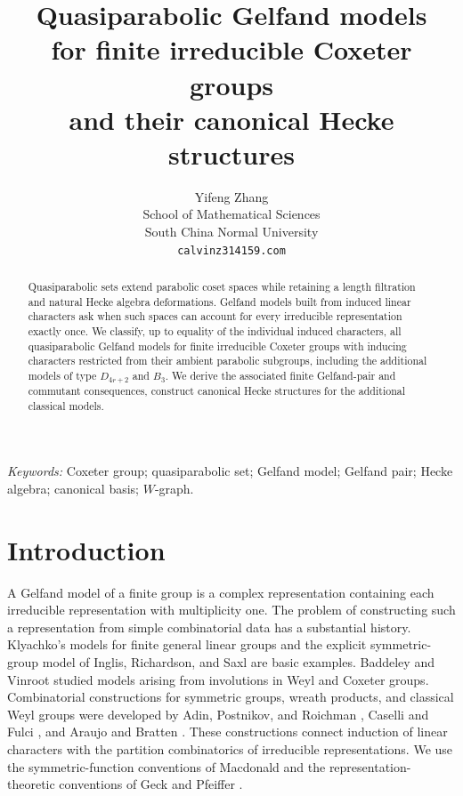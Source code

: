 \documentclass[11pt]{article}
\title{Quasiparabolic Gelfand models\\
for finite irreducible Coxeter groups\\
and their canonical Hecke structures}
\author{Yifeng Zhang
\\
School of Mathematical Sciences \\
South China Normal University \\
{\tt calvinz314159\@gmail.com}}
\date{}
\numberwithin{equation}{section}
\theoremstyle{definition}
\begin{document}
\begingroup\renewcommand{\@}{\char64\relax}\maketitle\endgroup
\begin{abstract}
Quasiparabolic sets extend parabolic coset spaces while retaining a length filtration and natural Hecke algebra deformations.
Gelfand models built from induced linear characters ask when such spaces can account for every irreducible representation exactly once.
We classify, up to equality of the individual induced characters, all quasiparabolic Gelfand models for finite irreducible Coxeter groups with inducing characters restricted from their ambient parabolic subgroups, including the additional models of type \(D_{4r+2}\) and \(B_3\).
We derive the associated finite Gelfand-pair and commutant consequences, construct canonical Hecke structures for the additional classical models.
\end{abstract}
\noindent\textit{Keywords:} Coxeter group; quasiparabolic set; Gelfand model; Gelfand pair; Hecke algebra; canonical basis; \(W\)-graph.



\section{Introduction}
\label{sec:intro}

A Gelfand model of a finite group is a complex representation containing each irreducible representation with multiplicity one.
The problem of constructing such a representation from simple combinatorial data has a substantial history.
Klyachko's models for finite general linear groups \cite{Klyachko} and the explicit symmetric-group model of Inglis, Richardson, and Saxl \cite{IRS} are basic examples.
Baddeley \cite{Baddeley} and Vinroot \cite{Vinroot} studied models arising from involutions in Weyl and Coxeter groups.
Combinatorial constructions for symmetric groups, wreath products, and classical Weyl groups were developed by Adin, Postnikov, and Roichman \cite{APR,APRwreath}, Caselli and Fulci \cite{CaselliFulci}, and Araujo and Bratten \cite{AraujoBratten}.
These constructions connect induction of linear characters with the partition combinatorics of irreducible representations.
We use the symmetric-function conventions of Macdonald \cite{MacdonaldBook} and the representation-theoretic conventions of Geck and Pfeiffer \cite{GeckPfeiffer}.
\end{document}
